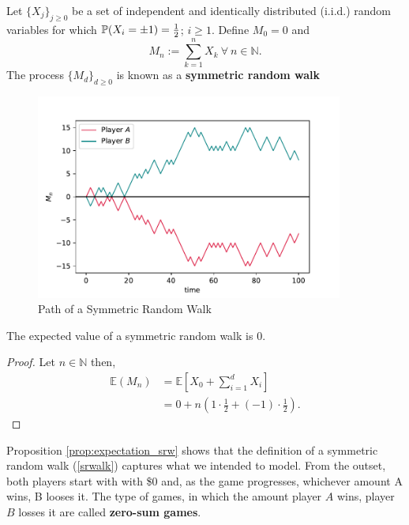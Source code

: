 \documentclass[../TGMAFFIRO]{subfiles}
\begin{document}
\begin{definition}\label{srwalk}
	Let $\{X_j\}_{j\geq0}$ be a set of independent and identically distributed (i.i.d.) random variables for which $\mathbb{P}(X_i = \pm 1) = \frac{1}{2}$; $i \geq 1$. Define $M_0 = 0$ and
	\begin{equation}
		M_n := \sum_{k=1}^n X_k \ \forall \ n \in \mathbb{N}.
	\end{equation}
	The process $\{M_d\}_{d\geq 0}$ is known as a \textbf{symmetric random walk}
\end{definition}

\begin{figure}
	\label{fig:symmetric_random_walk}
	\centering
	\includegraphics[width=0.9\textwidth]{../images/symmetric_random_walk}
	\caption{Path of a Symmetric Random Walk}
\end{figure}

\begin{proposition}\label{prop:expectation_srw}
	The expected value of a symmetric random walk is 0.
\end{proposition}

\begin{proof}
	Let $n \in \mathbb{N}$ then,
	\begin{align*}
	\mathbb{E}(M_n) &= \mathbb{E}\left[X_0 + \sum_{i=1}^d X_i\right]\\
				    &= 0 + n  \left( 1 \cdot \frac{1}{2} + (-1) \cdot \frac{1}{2}\right).
	\end{align*}
\end{proof}

Proposition \ref{prop:expectation_srw} shows that the definition of a symmetric random walk (\ref{srwalk}) captures what we intended to model. From the outset, both players start with with \$0 and, as the game progresses, whichever amount A wins, B looses it. The type of games, in which the amount player $A$ wins, player $B$ losses it are called \textbf{zero-sum games}.\\
\end{document}
